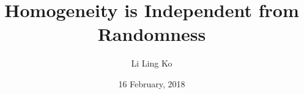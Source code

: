 \documentclass[notes]{beamer}
\title{Homogeneity is Independent from Randomness}
\author{Li Ling Ko}
\institute{University of Notre Dame}
\date{16 February, 2018}
\begin{document}
\begin{frame}
  \titlepage
\end{frame}






\end{document}
